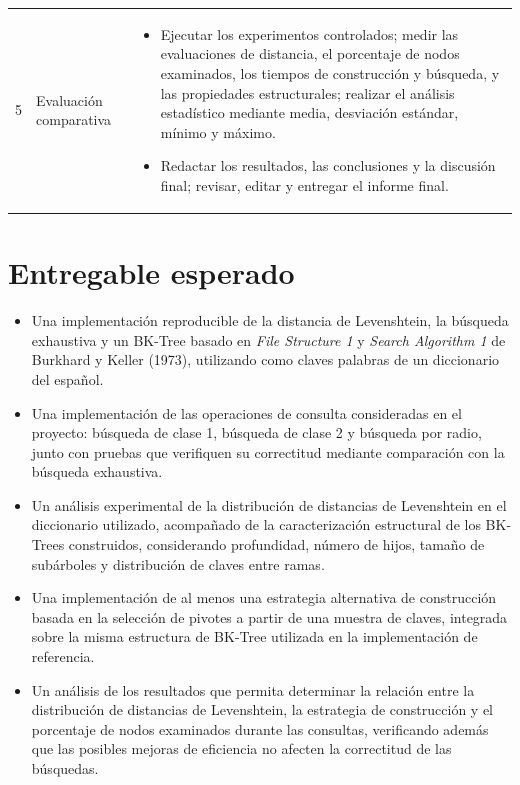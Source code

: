 \documentclass[11pt]{article}
\begin{document}
\begin{longtable}{p{1.5cm}p{3.5cm}p{9.2cm}}
5 & Evaluación comparativa &
\begin{itemize}[leftmargin=*, nosep]
\item Ejecutar los experimentos controlados; medir las evaluaciones de distancia, el porcentaje de nodos examinados, los tiempos de construcción y búsqueda, y las propiedades estructurales; realizar el análisis estadístico mediante media, desviación estándar, mínimo y máximo.
\item Redactar los resultados, las conclusiones y la discusión final; revisar, editar y entregar el informe final.
\end{itemize} \\
\end{longtable}




\section{Entregable esperado}

\begin{itemize}[leftmargin=1.4em]

  \item Una implementación reproducible de la distancia de Levenshtein, la búsqueda exhaustiva y un BK-Tree basado en \emph{File Structure 1} y \emph{Search Algorithm 1} de Burkhard y Keller (1973), utilizando como claves palabras de un diccionario del español.

  \item Una implementación de las operaciones de consulta consideradas en el proyecto: búsqueda de clase 1, búsqueda de clase 2 y búsqueda por radio, junto con pruebas que verifiquen su correctitud mediante comparación con la búsqueda exhaustiva.

  \item Un análisis experimental de la distribución de distancias de Levenshtein en el diccionario utilizado, acompañado de la caracterización estructural de los BK-Trees construidos, considerando profundidad, número de hijos, tamaño de subárboles y distribución de claves entre ramas.

  \item Una implementación de al menos una estrategia alternativa de construcción basada en la selección de pivotes a partir de una muestra de claves, integrada sobre la misma estructura de BK-Tree utilizada en la implementación de referencia.

  \item Un análisis de los resultados que permita determinar la relación entre la distribución de distancias de Levenshtein, la estrategia de construcción y el porcentaje de nodos examinados durante las consultas, verificando además que las posibles mejoras de eficiencia no afecten la correctitud de las búsquedas.

\end{itemize}
\end{document}

